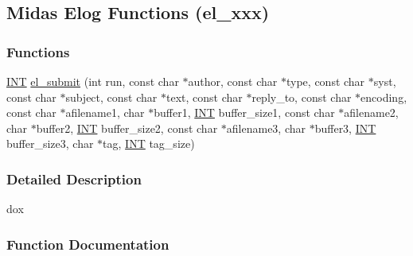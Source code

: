 \subsection{Midas Elog Functions (el\_\-xxx)}
\label{group__elfunctioncode}
\subsubsection*{Functions}
\begin{DoxyCompactItemize}
\item 
\hyperlink{vppg_8h_a392e62da233ed3e2f7c3fd4f487a3896}{INT} \hyperlink{group__elfunctioncode_gae698a2d388573565a5673afbd3b40f9b}{el\_\-submit} (int run, const char $\ast$author, const char $\ast$type, const char $\ast$syst, const char $\ast$subject, const char $\ast$text, const char $\ast$reply\_\-to, const char $\ast$encoding, const char $\ast$afilename1, char $\ast$buffer1, \hyperlink{vppg_8h_a392e62da233ed3e2f7c3fd4f487a3896}{INT} buffer\_\-size1, const char $\ast$afilename2, char $\ast$buffer2, \hyperlink{vppg_8h_a392e62da233ed3e2f7c3fd4f487a3896}{INT} buffer\_\-size2, const char $\ast$afilename3, char $\ast$buffer3, \hyperlink{vppg_8h_a392e62da233ed3e2f7c3fd4f487a3896}{INT} buffer\_\-size3, char $\ast$tag, \hyperlink{vppg_8h_a392e62da233ed3e2f7c3fd4f487a3896}{INT} tag\_\-size)
\end{DoxyCompactItemize}


\subsubsection{Detailed Description}
dox 

\subsubsection{Function Documentation}
